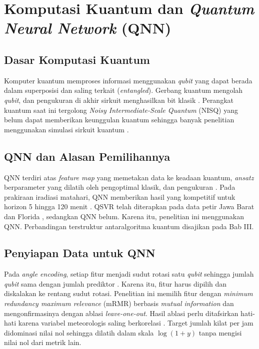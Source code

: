 \section{Komputasi Kuantum dan \textit{Quantum Neural Network} (QNN)}

\subsection{Dasar Komputasi Kuantum}
Komputer kuantum memproses informasi menggunakan \textit{qubit} yang dapat berada dalam superposisi dan saling terkait (\textit{entangled}).
Gerbang kuantum mengolah \textit{qubit}, dan pengukuran di akhir sirkuit menghasilkan bit klasik \cite{oliveira2024QNN}.
Perangkat kuantum saat ini tergolong \textit{Noisy Intermediate-Scale Quantum} (NISQ) yang belum dapat memberikan keunggulan kuantum sehingga banyak penelitian menggunakan simulasi sirkuit kuantum \cite{oliveira2024QNN}.

\subsection{QNN dan Alasan Pemilihannya}
QNN terdiri atas \textit{feature map} yang memetakan data ke keadaan kuantum, \textit{ansatz} berparameter yang dilatih oleh pengoptimal klasik, dan pengukuran \cite{oliveira2024QNN}.
Pada prakiraan iradiasi matahari, QNN memberikan hasil yang kompetitif untuk horizon 5 hingga 120 menit \cite{oliveira2024QNN}.
QSVR telah diterapkan pada data petir Jawa Barat dan Florida \cite{fadhil2025}, sedangkan QNN belum.
Karena itu, penelitian ini menggunakan QNN.
Perbandingan terstruktur antaralgoritma kuantum disajikan pada Bab III.

\subsection{Penyiapan Data untuk QNN}
Pada \textit{angle encoding}, setiap fitur menjadi sudut rotasi satu \textit{qubit} sehingga jumlah \textit{qubit} sama dengan jumlah prediktor \cite{oliveira2024QNN}.
Karena itu, fitur harus dipilih dan diskalakan ke rentang sudut rotasi.
Penelitian ini memilih fitur dengan \textit{minimum redundancy maximum relevance} (mRMR) berbasis \textit{mutual information} dan mengonfirmasinya dengan ablasi \textit{leave-one-out}.
Hasil ablasi perlu ditafsirkan hati-hati karena variabel meteorologis saling berkorelasi \cite{cheng2024MLLP}.
Target jumlah kilat per jam didominasi nilai nol sehingga dilatih dalam skala $\log(1+y)$ tanpa mengisi nilai nol dari metrik lain.

